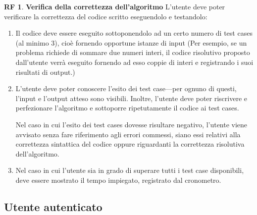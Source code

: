 \documentclass[11pt, a4paper]{article}
\theoremstyle{definition}
\newtheorem{funcreq}{RF} %
\begin{document}
\newpage
\begin{funcreq}
\label{test}
\textbf{Verifica della correttezza dell'algoritmo }
L'utente deve poter verificare la correttezza del codice scritto eseguendolo
e testandolo:
\begin{enumerate}
    \item Il codice deve essere eseguito sottoponendolo ad un certo numero
    di test cases (al minimo 3), cioè fornendo opportune istanze di input
    (Per esempio, se un problema richiede di sommare due numeri interi, il
    codice risolutivo proposto dall'utente verrà eseguito fornendo ad esso
    coppie di interi e registrando i suoi risultati di output.)

    \item L'utente deve poter conoscere l'esito dei test case—per ognuno
    di questi, l'input e l'output atteso sono visibili. Inoltre, l'utente
    deve poter riscrivere e perfezionare l'algoritmo e sottoporre ripetutamente
    il codice ai test cases.
    
    Nel caso in cui l'esito dei test cases dovesse risultare negativo, l'utente
    viene avvisato senza fare riferimento agli errori commessi, siano essi
    relativi alla correttezza sintattica del codice oppure riguardanti la
    correttezza risolutiva dell'algoritmo.

    \item Nel caso in cui l'utente sia in grado di superare tutti i
    test case disponibili, deve essere mostrato il tempo impiegato,
    registrato dal cronometro.
\end{enumerate}
\end{funcreq}

\begin{center}
    \section*{Utente autenticato}
\end{center}
\end{document}
